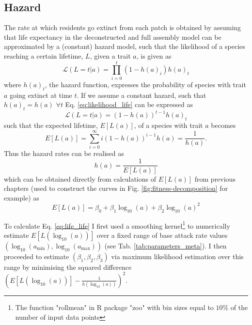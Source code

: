 \documentclass[a4paper]{report}
\DeclareMathOperator{\log}{log}
\DeclareMathOperator{\min}{min}
\DeclareMathOperator{\max}{max}
\begin{document}
\subsection{Hazard} The rate at which residents go extinct from each patch is obtained by assuming that life expectancy in the deconstructed and full assembly model can be approximated by a (constant) hazard model, such that the likelihood of a species reaching a certain lifetime, $L$, given a trait $a$, is given as
\begin{equation}
\mathscr{L}(L=t|a) = \prod_{i=0}^t (1-h(a)_i) h(a)_t \label{eq:likelihood_life}
\end{equation}
where $h(a)_t$, the hazard function, expresses the probability of species with trait $a$ going extinct at time $t$. If we assume a constant hazard, such that $h(a)_t=h(a)$ $\forall t$ Eq. \eqref{eq:likelihood_life} can be expressed as
\begin{equation}
\mathscr{L}(L=t|a) = (1-h(a))^{t-1}h(a)_t \label{eq:likelihood_life2}
\end{equation}
such that the expected lifetime, $E[L(a)]$, of a species with trait $a$ becomes 
\begin{equation}
E[L(a)] = \sum_{i=0}^{\infty}i(1-h(a))^{i-1}h(a)=\frac{1}{h(a)}. \label{eq:expected_life}
\end{equation}
Thus the hazard rates can be realised as 
\begin{equation}
h(a) = \frac{1}{E[L(a)]} \label{eq:death_rate}
\end{equation}
which can be obtained directly from calculations of $E[L(a)]$ from previous chapters (used to construct the curves in Fig. \ref{fig:fitness-decomposition} for example) as
\begin{equation}
E[L(a)] = \beta_0  + \beta_1 \log_{10}(a) + \beta_2 \log_{10}(a)^2 \label{eq:life_life}
\end{equation}

To calculate Eq. \eqref{eq:life_life} I first used a smoothing kernel\footnote{The function "rollmean" in R package "zoo" with bin sizes equal to $10\%$ of the number of input data points} to numerically estimate $E[L(\log_{10}(a))]$ over a fixed range of base attack rate values $(\log_{10}(a_{\min}),\log_{10}(a_{\max}))$ (see Tab. \ref{tab:parameters_meta}). I then proceeded to estimate $(\beta_1,\beta_2,\beta_3)$ via maximum likelihood estimation over this range by minimising the squared difference $(E[L(\log_{10}(a))]-\frac{1}{h(\log_{10}(a))})^2$.\\
\end{document}
